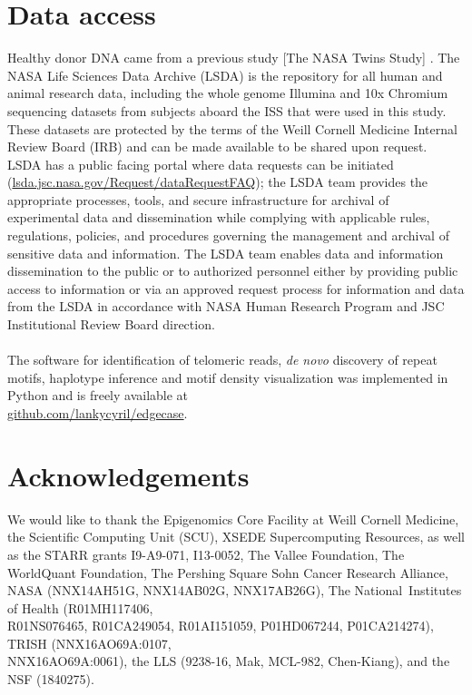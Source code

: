 \documentclass{article}
\begin{document}
\section*{Data access} 
Healthy donor DNA came from a previous study [The NASA Twins Study] \parencite{twins_study}.
The NASA Life Sciences Data Archive (LSDA) is the repository for all human and animal research data, including the whole genome Illumina and 10x Chromium sequencing datasets from subjects aboard the ISS that were used in this study.
These datasets are protected by the terms of the Weill Cornell Medicine Internal Review Board (IRB) and can be made available to be shared upon request.
LSDA has a public facing portal where data requests can be initiated (\href{https://lsda.jsc.nasa.gov/Request/dataRequestFAQ}{lsda.jsc.nasa.gov/Request/dataRequestFAQ});
the LSDA team provides the appropriate processes, tools, and secure infrastructure for archival of experimental data and dissemination while complying with applicable rules, regulations, policies, and procedures governing the management and archival of sensitive data and information.
The LSDA team enables data and information dissemination to the public or to authorized personnel either by providing public access to information or via an approved request process for information and data from the LSDA in accordance with NASA Human Research Program and JSC Institutional Review Board direction.
\\~\\
The software for identification of telomeric reads, \textit{de novo} discovery of repeat motifs, haplotype inference and motif density visualization was implemented in Python and is freely available at \\%
\href{https://github.com/lankycyril/edgecase}{github.com/lankycyril/edgecase}.

\section*{Acknowledgements} 
We would like to thank
the Epigenomics Core Facility at Weill Cornell Medicine,
the Scientific Computing Unit (SCU),
XSEDE Supercomputing Resources,
as well as
the STARR grants I9-A9-071, I13-0052,
The Vallee Foundation,
The WorldQuant Foundation,
The Pershing Square Sohn Cancer Research Alliance,
NASA (NNX14AH51G, NNX14AB02G, NNX17AB26G),
The National Institutes of Health (R01MH117406, \\%
R01NS076465, R01CA249054, R01AI151059, P01HD067244, P01CA214274),
TRISH (NNX16AO69A:0107, \\%
NNX16AO69A:0061),
the LLS (9238-16, Mak, MCL-982, Chen-Kiang),
and
the NSF (1840275).
\end{document}
